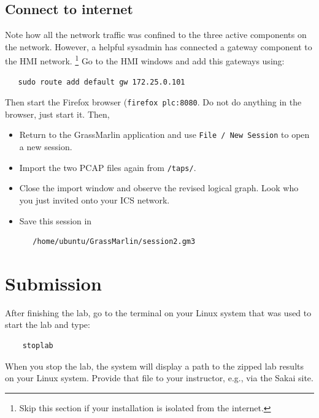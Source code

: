 \subsection{Connect to internet}
Note how all the network traffic was confined to the three active components on the network.  However, a helpful sysadmin has connected
a gateway component to the HMI network.  \footnote{Skip this section if your installation is isolated from the internet.}  
Go to the HMI windows and add this gateways using:
\begin{verbatim}
   sudo route add default gw 172.25.0.101
\end{verbatim}
\noindent Then start the Firefox browser ({\tt firefox plc:8080}.  Do not do anything in the browser, just start it. Then,
\begin{itemize}
\item Return to the GrassMarlin application and use {\tt File / New Session} to open a new session.  
\item Import the two PCAP files again from {\tt /taps/}.  
\item Close the import window and observe the revised logical graph.  Look who you just invited onto your ICS network.
\item Save this session in 
\begin{verbatim}
   /home/ubuntu/GrassMarlin/session2.gm3
\end{verbatim}
\end{itemize}


\section{Submission}
After finishing the lab, go to the terminal on your Linux system that was used to start the lab and type:
\begin{verbatim}
    stoplab 
\end{verbatim}
When you stop the lab, the system will display a path to the zipped lab results on your Linux system.  Provide that file to 
your instructor, e.g., via the Sakai site.


